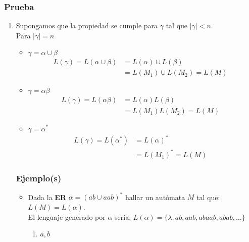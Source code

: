\subsubsection*{Prueba}
\begin{enumerate}
\item Supongamos que la propiedad se cumple para $\gamma$ tal que $|\gamma| < n$.\\${ }$\\ Para $|\gamma|=n$
\begin{itemize}
\item $\gamma=\alpha\cup\beta$
\begin{align*}
L(\gamma) = L(\alpha\cup\beta)&= L(\alpha)\cup L(\beta) & \\
	                       &= L(M_1)\cup L(M_2)      =L(M)
\end{align*}
\item $\gamma=\alpha\beta$
\begin{align*}
L(\gamma) = L(\alpha\beta)&= L(\alpha) L(\beta) & \\
	                       &= L(M_1) L(M_2)      =L(M)
\end{align*}
\item $\gamma=\alpha^*$
\begin{align*}
L(\gamma) = L(\alpha^*)&= L(\alpha)^* & \\
	                       &= L(M_1)^*      =L(M)
\end{align*}
\end{itemize}

\subsubsection{Ejemplo(s)}
\begin{itemize}
\item Dada la \textbf{ER} $\alpha = (ab \cup aab)^*$ hallar un autómata $M$ tal que: $L(M) = L(\alpha)$. \\${ }$\\
El lenguaje generado por $\alpha$ sería: $L(\alpha) =\{ \lambda,ab,aab,abaab,abab,\ldots \}$
\begin{enumerate}[label=\textbf{Paso} \arabic*:]
\item $a,b$
\begin{figure}[h]
\centering
{}
\end{figure}
\end{enumerate}
\end{itemize}
\end{enumerate}
